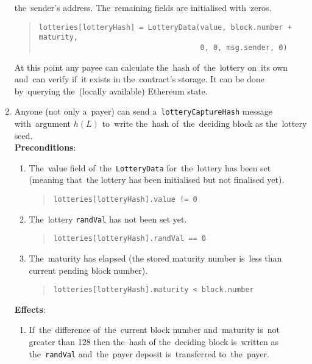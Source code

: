 \documentclass[a4paper]{article}
\newcommand{\lotteryhash}[1]{h({#1})}
\begin{document}
\begin{enumerate}
            the~sender's address. The~remaining fields are initialised with~zeros.
            \begin{quote}
              \verb!lotteries[lotteryHash] = LotteryData(value, block.number + maturity,!\\
              \verb!                                     0, 0, msg.sender, 0)!
            \end{quote}
            At this point any payee can calculate the~hash of~the~lottery on~its own and~can verify if~it exists in
            the~contract's storage. It can be done by~querying the~(locally available) Ethereum state.
        \item Anyone (not only a~payer) can send a~\texttt{lotteryCaptureHash} message with~argument $\lotteryhash{L}$ to~write
            the~hash of~the~deciding block as the~lottery seed.\\
            \textbf{Preconditions}:
            \begin{enumerate}
                \item The~value field of~the~\texttt{LotteryData} for~the~lottery has been set (meaning that~the
                lottery has been initialised but not finalised yet).
                \begin{quote}
                  \verb|lotteries[lotteryHash].value != 0|
                \end{quote}
                \item The~lottery \texttt{randVal} has not been set yet.
                  \begin{quote}
	            \verb!lotteries[lotteryHash].randVal == 0!
	          \end{quote}
                \item The~maturity has elapsed (the stored maturity number is~less than current pending block number).
                  \begin{quote}
                    \verb!lotteries[lotteryHash].maturity < block.number!
                  \end{quote}
	        \end{enumerate}
        \textbf{Effects}:
        \begin{enumerate}
            \item  If~the~difference of~the~current block number and~maturity is~not greater than 128 then the~hash of
                the~deciding block is~written as the~\texttt{randVal} and~the~payer deposit is~transferred to~the~payer.
                \begin{quote}

\end{quote}
\end{enumerate}
\end{enumerate}
\end{document}
